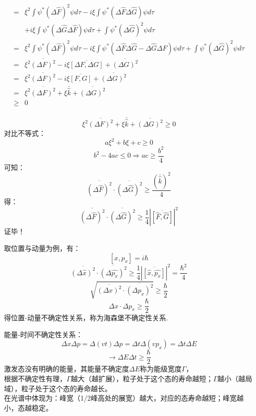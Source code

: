 \begin{frame}   
    $$
    \begin{aligned}
    =& \xi^{2} \int \psi^{*}(\Delta \hat{F})^{2} \psi d \tau-i \xi \int \psi^{*}(\Delta \hat{F} \Delta \hat{G}) \psi d \tau \\
    &+i \xi \int \psi^{*}(\Delta \hat{G} \Delta \hat{F}) \psi d \tau+\int \psi^{*}(\Delta \hat{G})^{2} \psi d \tau \\
    =& \xi^{2} \int \psi^{*}(\Delta \hat{F})^{2} \psi d \tau-i \xi \int \psi^{*}(\Delta \hat{F} \Delta \hat{G}-\Delta \hat{G} \Delta \hat{F}) \psi d \tau+\int \psi^{*}(\Delta \hat{G})^{2} \psi d \tau \\
    =& \xi^{2} \overline{(\Delta F)^{2}}-i \xi \overline{[\Delta F, \Delta G]}+\overline{(\Delta G)^{2}}\\
    =&\xi^{2} \overline{(\Delta F)^{2}}-i\xi \overline{[F, G]}+\overline{(\Delta G)^{2}} \\
    =&\xi^{2} \overline{(\Delta F)^{2}}+\xi \bar{\hat{k}}+\overline{(\Delta G)^{2}} \\
    \geq & 0\\
    \end{aligned}
    $$
\end{frame} 

\begin{frame} 
    \[\xi^{2} \overline{(\Delta F)^{2}}+\xi \bar{\hat{k}}+\overline{(\Delta G)^{2}} \geq  0\]  
    对比不等式：
    $$
    a \xi^{2}+b \xi+c \geq 0
    $$
    $$
    b^{2}-4 a c \leq 0 \Rightarrow a c \geq \frac{b^{2}}{4}
    $$
    可知： 
    $$
    \overline{(\Delta \hat{F})^{2}} \cdot \overline{(\Delta \hat{G})^{2}} \geq \frac{(\bar{\hat{k}})^{2}}{4}
    $$
    得： 
    $$
    \boxed{\overline{(\Delta \hat{F})^{2}} \cdot \overline{(\Delta \hat{G})^{2}} \geq \frac{1}{4}|\overline{[\hat{F}, \hat{G}]}|^{2}}
    $$
    证毕！
\end{frame} 

\begin{frame}
取位置与动量为例，有：
$$ [x,p_x]=i\hbar $$
$$
\overline{(\Delta \hat{x})^{2}} \cdot \overline{(\Delta \hat{p_x})^{2}} 
\geq \frac{1}{4}|\overline{[\hat{x}, \hat{p_x}]}|^{2}=\frac{\hbar^2}{4}
$$
$$
\sqrt{\overline{(\Delta x)^{2}} \cdot \overline{(\Delta p_x)^{2}}} 
\geq \frac{\hbar}{2}
$$
$$  
\boxed{\Delta x \cdot \Delta p_x 
\geq \frac{\hbar}{2}}
$$ 
得位置-动量不确定性关系，称为海森堡不确定性关系.
\end{frame}

\begin{frame}
    能量-时间不确定性关系：
    \[\Delta x \Delta p = \Delta (vt)  \Delta p = \Delta t  \Delta (vp_x)= \Delta t  \Delta E \]
    \[\to \Delta E \Delta t \geq \frac{\hbar}{2}  \]
    {\Bullet} 激发态没有明确的能量，其能量不确定度$\Delta E$称为能级宽度$\Gamma$，\\ \vspace{0.6em}
    {\Bullet} 根据不确定性有理，$\Gamma$越大（越扩展），粒子处于这个态的寿命越短；$\Gamma$越小（越局域），粒子处于这个态的寿命越长。\\ \vspace{0.6em}
    {\Bullet} 在光谱中体现为：峰宽（1/2峰高处的展宽）越大，对应的态寿命越短；峰宽越小，态越稳定。 
\end{frame}

